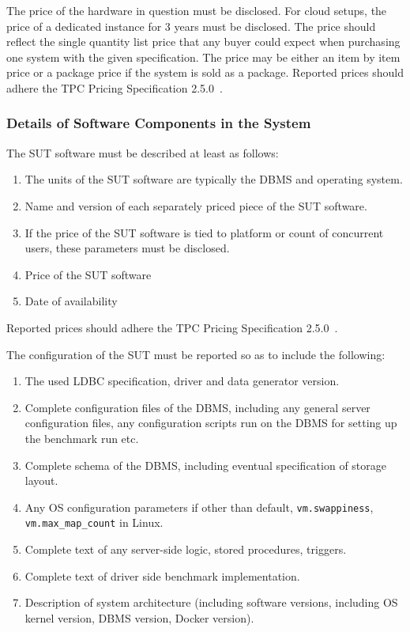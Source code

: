 The price of the hardware in question must be disclosed. For cloud setups, the price of a dedicated instance for 3 years must be disclosed. The price should reflect the single quantity list price that any buyer could expect when purchasing one system with the given specification. The price may be either an item by item price or a package price if the system is sold as a package.
Reported prices should adhere the TPC Pricing Specification 2.5.0~\cite{pricing,tpc-pricing}.

\subsubsection{Details of Software Components in the System}
The SUT software must be described at least as follows:
\begin{enumerate}
    \item The units of the SUT software are typically the DBMS and operating system.
    \item Name and version of each separately priced piece of the SUT software.
    \item If the price of the SUT software is tied to platform or count of concurrent users, these parameters must be disclosed.
    \item Price of the SUT software
    \item Date of availability
\end{enumerate}
Reported prices should adhere the TPC Pricing Specification 2.5.0~\cite{pricing,tpc-pricing}.

The configuration of the SUT must be reported so as to include the following:
\begin{enumerate}
    \item The used LDBC specification, driver and data generator version.
    \item Complete configuration files of the DBMS, including any general server configuration files, any configuration scripts run on the DBMS for setting up the benchmark run etc.
    \item Complete schema of the DBMS, including eventual specification of storage layout.
    \item Any OS configuration parameters if other than default, \eg \verb+vm.swappiness+, \verb+vm.max_map_count+ in Linux.
    \item Complete text of any server-side logic, \eg stored procedures, triggers.
    \item Complete text of driver side benchmark implementation.
    \item Description of system architecture (including software versions, including OS kernel version, DBMS version, Docker version).
\end{enumerate}


